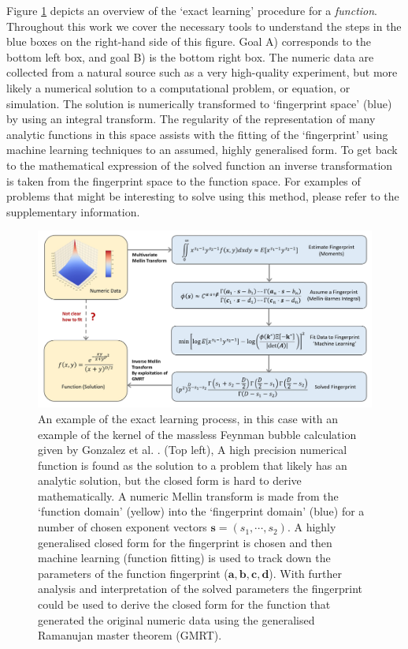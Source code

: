 \documentclass{article}
\begin{document}
Figure \ref{fig:Outline} depicts an overview of the `exact learning' procedure for a \emph{function}. Throughout this work we cover the necessary tools to understand the steps in the blue boxes on the right-hand side of this figure. Goal A) corresponds to the bottom left box, and goal B) is the bottom right box. The numeric data are collected from a natural source such as a very high-quality experiment, but more likely a numerical solution to a computational problem, or equation, or simulation. The solution is numerically transformed to `fingerprint space' (blue) by using an integral transform. The regularity of the representation of many analytic functions in this space assists with the fitting of the `fingerprint' using machine learning techniques to an assumed, highly generalised form. To get back to the mathematical expression of the solved function an inverse transformation is taken from the  fingerprint space to the function space. For examples of problems that might be interesting to solve using this method, please refer to the supplementary information. \\

\begin{figure}[h]
\includegraphics[scale = 0.323]{Figure1.jpg}
\caption{An example of the exact learning process, in this case with an example of the kernel of the massless Feynman bubble calculation given by Gonzalez et al. \cite{Gonzalez2015}. (Top left), A high precision numerical function is found as the solution to a problem that likely has an analytic solution, but the closed form is hard to derive mathematically. A numeric Mellin transform is made from the `function domain' (yellow) into the `fingerprint domain' (blue) for a number of chosen exponent vectors $\mathbf{s}=(s_1,\cdots,s_2)$. A highly generalised closed form for the fingerprint is chosen and then machine learning (function fitting) is used to track down the parameters of the function fingerprint ($\mathbf{a,b,c,d}$). With further analysis and interpretation of the solved parameters the fingerprint could be used to derive the closed form for the function that generated the original numeric data using the generalised Ramanujan master theorem (GMRT).}
\label{fig:Outline}
\end{figure}
\end{document}
